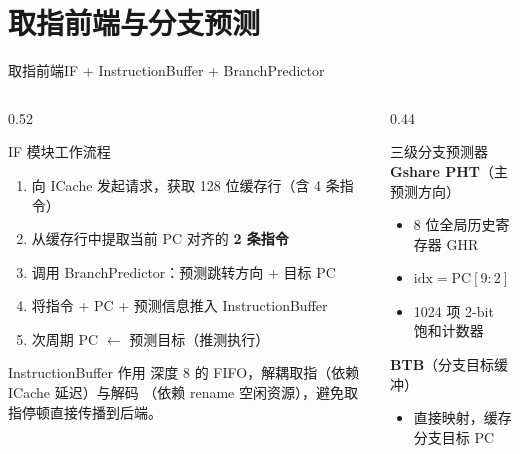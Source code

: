 \documentclass[aspectratio=169,xcolor={dvipsnames,svgnames},10pt]{beamer}
\newcommand{\hl}[1]{\textcolor{AccentOrange}{\textbf{#1}}}
\begin{document}
\section{取指前端与分支预测}

\begin{frame}{取指前端}{IF + InstructionBuffer + BranchPredictor}
  \begin{columns}[T]
    \begin{column}{0.52\textwidth}
      \begin{block}{IF 模块工作流程}
        \small
        \begin{enumerate}
          \item 向 ICache 发起请求，获取 128 位缓存行（含 4 条指令）
          \item 从缓存行中提取当前 PC 对齐的 \hl{2 条指令}
          \item 调用 BranchPredictor：预测跳转方向 + 目标 PC
          \item 将指令 + PC + 预测信息推入 InstructionBuffer
          \item 次周期 PC $\leftarrow$ 预测目标（推测执行）
        \end{enumerate}
      \end{block}
      \vspace{0.2cm}
      \begin{alertblock}{InstructionBuffer 作用}
        \small 深度 8 的 FIFO，解耦取指（依赖 ICache 延迟）与解码
        （依赖 rename 空闲资源），避免取指停顿直接传播到后端。
      \end{alertblock}
    \end{column}
    \begin{column}{0.44\textwidth}
      \begin{block}{三级分支预测器}
        \small
        \textbf{Gshare PHT}（主预测方向）
        \begin{itemize}
          \item 8 位全局历史寄存器 GHR
          \item $\mathrm{idx} = \mathrm{PC}[9:2] \oplus \mathrm{GHR}$
          \item 1024 项 2-bit 饱和计数器
        \end{itemize}
        \vspace{0.1cm}
        \textbf{BTB}（分支目标缓冲）
        \begin{itemize}
          \item 直接映射，缓存分支目标 PC

\end{itemize}
\end{block}
\end{column}
\end{columns}
\end{frame}
\end{document}
